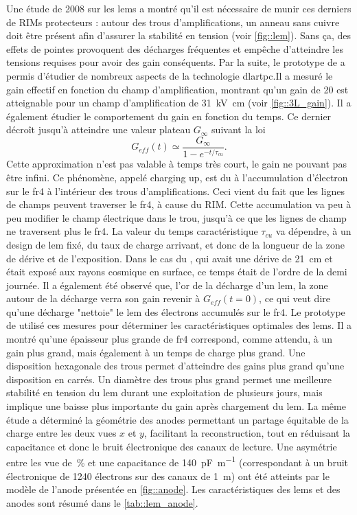       Une étude de 2008 sur les \glspl{lem}\cite{Breskin2008} a montré qu'il est nécessaire de munir ces derniers de RIMs protecteurs : autour des trous d'amplifications, un anneau sans cuivre doit être présent afin d'assurer la stabilité en tension (voir \autoref{fig::lem}). Sans ça, des effets de pointes provoquent des décharges fréquentes et empêche d'atteindre les tensions requises pour avoir des gain conséquents. Par la suite, le prototype de \threeL{}\cite{Cantini2013,Cantini2014} a permis d'étudier de nombreux aspects de la technologie \gls{dlartpc}.Il a mesuré le gain effectif en fonction du champ d'amplification, montrant qu'un gain de 20 est atteignable pour un champ d'amplification de \SI{31}{\kilo\volt\centi\meter} (voir \autoref{fig::3L_gain}). Il a également étudier le comportement du gain en fonction du temps. Ce dernier décroît jusqu'à atteindre une valeur plateau $G_{\infty}$ suivant la loi
      \begin{equation}
        G_{eff}(t)\simeq \frac{G_{\infty}}{1-e^{-t/\tau_{cu}}}.
      \end{equation}
      Cette approximation n'est pas valable à temps très court, le gain ne pouvant pas être infini. Ce phénomène, appelé charging up, est du à l'accumulation d'électron sur le \gls{fr4} à l'intérieur des trous d'amplifications. Ceci vient du fait que les lignes de champs peuvent traverser le \gls{fr4}, à cause du RIM. Cette accumulation va peu à peu modifier le champ électrique dans le trou, jusqu'à ce que les lignes de champ ne traversent plus le \gls{fr4}. La valeur du temps caractéristique $\tau_{cu}$ va dépendre, à un design de \gls{lem} fixé, du taux de charge arrivant, et donc de la longueur de la zone de dérive et de l'exposition. Dans le cas du \threeL{}, qui avait une dérive de \SI{21}{\centi\meter} et était exposé aux rayons cosmique en surface, ce temps était de l'ordre de la demi journée. Il a également été observé que, l'or de la décharge d'un \gls{lem}, la zone autour de la décharge verra son gain revenir à $G_{eff}(t=0)$, ce qui veut dire qu'une décharge "nettoie" le \gls{lem} des électrons accumulés sur le \gls{fr4}. Le prototype de \threeL{} utilisé ces mesures pour déterminer les caractéristiques optimales des \glspl{lem}. Il a montré qu'une épaisseur plus grande de \gls{fr4} correspond, comme attendu, à un gain plus grand, mais également à un temps de charge plus grand. Une disposition hexagonale des trous permet d'atteindre des gains plus grand qu'une disposition en carrés. Un diamètre des trous plus grand permet une meilleure stabilité en tension du \gls{lem} durant une exploitation de plusieurs jours, mais implique une baisse plus importante du gain après chargement du \gls{lem}. La même étude a déterminé la géométrie des anodes permettant un partage équitable de la charge entre les deux vues $x$ et $y$, facilitant la reconstruction, tout en réduisant la capacitance et donc le bruit électronique des canaux de lecture. Une asymétrie entre les vue de \,\% et une capacitance de \SI{140}{\pico\farad\per\meter} (correspondant à un bruit électronique de 1240 électrons sur des canaux de \SI{1}{\meter}) ont été atteints par le modèle de l'anode présentée en \autoref{fig::anode}. Les caractéristiques des \glspl{lem} et des anodes sont résumé dans le \autoref{tab::lem_anode}.

